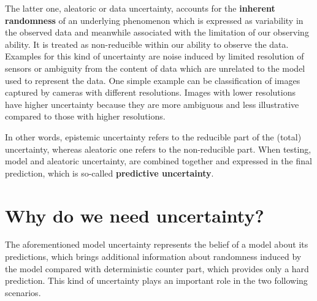 The latter one, aleatoric or data uncertainty, accounts for the \textbf{inherent randomness} of an underlying phenomenon which is expressed as variability in the observed data and meanwhile associated with the limitation of our observing ability. It is treated as non-reducible within our ability to observe the data. Examples for this kind of uncertainty are noise induced by limited resolution of sensors or ambiguity from the content of data which are unrelated to the model used to represent the data. One simple example can be classification of images captured by cameras with different resolutions. Images with lower resolutions have higher uncertainty because they are more ambiguous and less illustrative compared to those with higher resolutions. 

In other words, epistemic uncertainty refers to the reducible part of the (total) uncertainty, whereas aleatoric one refers to the non-reducible part. When testing, model and aleatoric uncertainty, are combined together and expressed in the final prediction, which is so-called \textbf{predictive uncertainty}.

\section{Why do we need uncertainty?}
The aforementioned model uncertainty represents the belief of a model about its predictions, which brings additional information about randomness induced by the model compared with deterministic counter part, which provides only a hard prediction. This kind of uncertainty plays an important role in the two following scenarios. 

